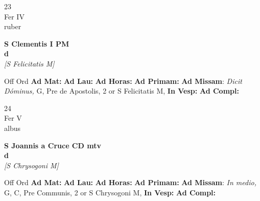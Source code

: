 \documentclass[10pt, openany]{book}
\begin{document}
    \begin{center}
        \begin{minipage}{3.5in}
            \vspace{2em}
            \begin{minipage}{0.5in}
                {\Huge 23} \\
                {\normalsize Fer IV} \\
                {\normalsize ruber}
            \end{minipage}
            \begin{minipage}{3.0in}
                \textbf{ \large S Clementis I PM \\
                \textnormal{\normalsize d}} \\ \textit{[S Felicitatis M]} \\ 
            \end{minipage}
            \begin{justify}Off Ord
                \textbf{Ad Mat: }
                \textbf{Ad Lau: }
                \textbf{Ad Horas: }
                \textbf{Ad Primam: }\textbf{Ad Missam}: \textit{Dicit Dóminus,} G, Pre de Apostolis, 2 or S Felicitatis M,  
                \textbf{In Vesp: }
                \textbf{Ad Compl: }
            \end{justify}
        \end{minipage}
    \end{center}

    \begin{center}
        \begin{minipage}{3.5in}
            \vspace{2em}
            \begin{minipage}{0.5in}
                {\Huge 24} \\
                {\normalsize Fer V} \\
                {\normalsize albus}
            \end{minipage}
            \begin{minipage}{3.0in}
                \textbf{ \large S Joannis a Cruce CD mtv \\
                \textnormal{\normalsize d}} \\ \textit{[S Chrysogoni M]} \\ 
            \end{minipage}
            \begin{justify}Off Ord
                \textbf{Ad Mat: }
                \textbf{Ad Lau: }
                \textbf{Ad Horas: }
                \textbf{Ad Primam: }\textbf{Ad Missam}: \textit{In medio,} G, C, Pre Communis, 2 or S Chrysogoni M,  
                \textbf{In Vesp: }
                \textbf{Ad Compl: }
            \end{justify}
        \end{minipage}
    \end{center}
\end{document}
